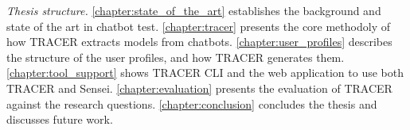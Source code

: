 \textit{Thesis structure.}
\autoref{chapter:state_of_the_art} establishes the background and state of the art in chatbot test.
\autoref{chapter:tracer} presents the core methodoly of how \ac{TRACER} extracts models from chatbots.
\autoref{chapter:user_profiles} describes the structure of the user profiles, and how \ac{TRACER} generates them.
\autoref{chapter:tool_support} shows \ac{TRACER} \ac{CLI} and the web application to use both \ac{TRACER} and Sensei.
\autoref{chapter:evaluation} presents the evaluation of \ac{TRACER} against the research questions.
\autoref{chapter:conclusion} concludes the thesis and discusses future work.




%
%
%
%
%
%
